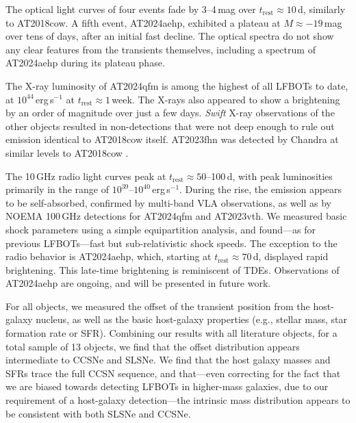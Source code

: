 \documentclass[twocolumn,twocolappendix, linenumbers, trackchanges]{aastex7}
\begin{document}
The optical light curves of four  events fade by 3--4\,mag over $t_\mathrm{rest}\approx10\,$d, similarly to AT2018cow. A fifth event,  AT2024aehp, exhibited a plateau at $M\approx-19\,$mag over tens of days, after an initial fast decline. The optical spectra do not show any clear features from the transients themselves, including a spectrum of AT2024aehp during its plateau phase. 

The X-ray luminosity of AT2024qfm is among the highest of all LFBOTs to date, at $10^{44}\,$erg\,s$^{-1}$ at $t_\mathrm{rest}\approx1\,$week. The X-rays also appeared to show a brightening by an order of magnitude over just a few days. \emph{Swift} X-ray observations of the other objects resulted in non-detections that were not deep enough to rule out emission identical to AT2018cow itself. AT2023fhn was detected by Chandra at similar levels to AT2018cow \citep{chrimesfhn,nayana2025}. 

The 10\,GHz radio light curves peak at $t_\mathrm{rest}\approx50$--100\,d, with peak luminosities primarily in the range of $10^{39}$--$10^{40}$\,erg\,s$^{-1}$. During the rise, the emission appears to be self-absorbed, confirmed by multi-band VLA observations, as well as by NOEMA 100\,GHz detections for AT2024qfm and AT2023vth. We measured basic shock parameters using a simple equipartition analysis, and found---as for previous LFBOTs---fast but sub-relativistic shock speeds. The exception to the radio behavior is AT2024aehp, which, starting at $t_\mathrm{rest}\approx70\,$d, displayed rapid brightening. This late-time brightening is reminiscent of TDEs. Observations of AT2024aehp are ongoing, and will be presented in future work. %

For all objects, we measured the offset of the transient position from the host-galaxy nucleus, as well as the basic host-galaxy properties (e.g., stellar mass, star formation rate or SFR). Combining our results with all literature objects, for a total sample of 13 objects, we find that the offset distribution appears intermediate to CCSNe and SLSNe. We find that the host galaxy masses and SFRs trace the full CCSN sequence, and that---even correcting for the fact that we are biased towards detecting LFBOTs in higher-mass galaxies, due to our requirement of a host-galaxy detection---the intrinsic mass distribution appears to be consistent with both SLSNe and CCSNe. 
\end{document}
